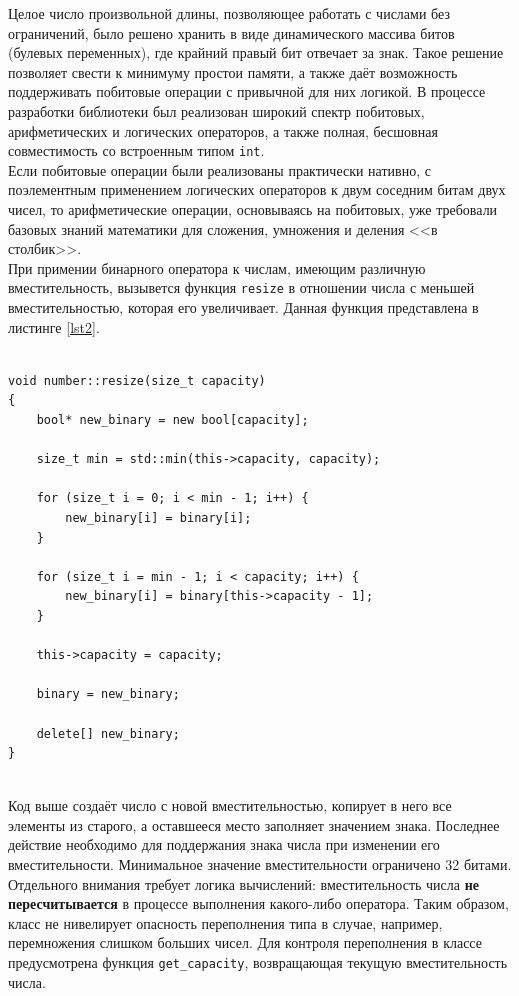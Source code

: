 \documentclass[a4paper,12pt]{article}
\begin{document}
Целое число произвольной длины, позволяющее работать с числами без ограничений, было решено хранить в виде динамического массива битов (булевых переменных), где крайний правый бит отвечает за знак.
Такое решение позволяет свести к минимуму простои памяти, а также даёт возможность поддерживать побитовые операции с привычной для них логикой.
В процессе разработки библиотеки был реализован широкий спектр побитовых, арифметических и логических операторов, а также полная, бесшовная совместимость со встроенным типом \verb!int!.\\

Если побитовые операции были реализованы практически нативно, с поэлементным применением логических операторов к двум соседним битам двух чисел, то арифметические операции, основываясь на побитовых, уже требовали базовых знаний математики для сложения, умножения и деления <<в столбик>>.\\

При примении бинарного оператора к числам, имеющим различную вместительность, вызывется функция \verb!resize! в отношении числа с меньшей вместительностью, которая его увеличивает.
Данная функция представлена в листинге \ref{lst2}.

\begin{lstlisting}[caption={Функция, меняющая вместительность числового типа},captionpos=b,label=lst2]
	
void number::resize(size_t capacity)
{
	bool* new_binary = new bool[capacity];
	
	size_t min = std::min(this->capacity, capacity);
	
	for (size_t i = 0; i < min - 1; i++) {
		new_binary[i] = binary[i];
	}
	
	for (size_t i = min - 1; i < capacity; i++) {
		new_binary[i] = binary[this->capacity - 1];
	}
	
	this->capacity = capacity;
	
	binary = new_binary;

	delete[] new_binary;
}
	
\end{lstlisting}

Код выше создаёт число с новой вместительностью, копирует в него все элементы из старого, а оставшееся место заполняет значением знака.
Последнее действие необходимо для поддержания знака числа при изменении его вместительности.
Минимальное значение вместительности ограничено 32 битами.\\

Отдельного внимания требует логика вычислений: вместительность числа \textbf{не пересчитывается} в процессе выполнения какого-либо оператора.
Таким образом, класс не нивелирует опасность переполнения типа в случае, например, перемножения слишком больших чисел.
Для контроля переполнения в классе предусмотрена функция \verb!get_capacity!, возвращающая текущую вместительность числа.\\
\end{document}
